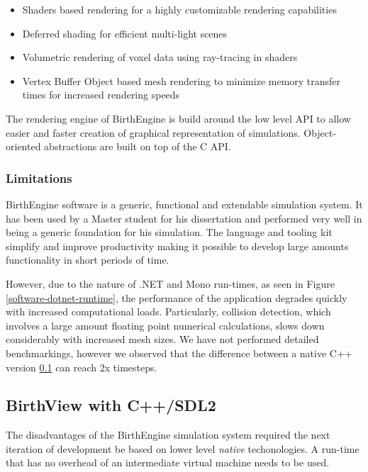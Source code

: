   \begin{itemize}
    \item Shaders based rendering for a highly customizable rendering capabilities
    \item Deferred shading for efficient multi-light scenes
    \item Volumetric rendering of voxel data using ray-tracing in shaders
    \item Vertex Buffer Object based mesh rendering to minimize memory transfer times for increased rendering speeds
  \end{itemize}

  The rendering engine of BirthEngine is build around the low level API to allow easier and faster creation of graphical representation of simulations. Object-oriented abstractions are built on top of the C API.

\subsubsection{Limitations}

BirthEngine software is a generic, functional and extendable simulation system. It has been used by a Master student for his dissertation and performed very well in being a generic foundation for his simulation. The language and tooling kit simplify and improve productivity making it possible to develop large amounts functionality in short periods of time.

However, due to the nature of .NET and Mono run-times, as seen in Figure \ref{software-dotnet-runtime}, the performance of the application degrades quickly with increased computational loads. Particularly, collision detection, which involves a large amount floating point numerical calculations, slows down considerably with increased mesh sizes. We have not performed detailed benchmarkings, however we observed that the difference between a native C++ version \ref{birthview} can reach 2x timesteps.

\subsection{BirthView with C++/SDL2} \label{birthview}

The disadvantages of the BirthEngine simulation system required the next iteration of development be based on lower level \textit{native} techonologies. A run-time that has no overhead of an intermediate virtual machine needs to be used.


